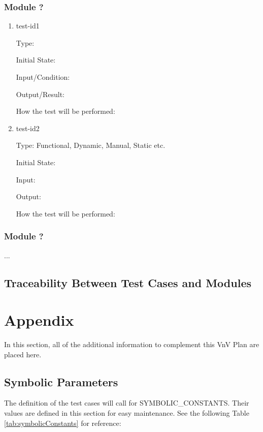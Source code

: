 \documentclass[12pt, titlepage]{article}
\begin{document}
\subsubsection{Module ?}
		
\begin{enumerate}

\item{test-id1\\}

Type: 
					
Initial State: 
					
Input/Condition: 
					
Output/Result: 
					
How the test will be performed: 
					
\item{test-id2\\}

Type: Functional, Dynamic, Manual, Static etc.
					
Initial State: 
					
Input: 
					
Output: 
					
How the test will be performed: 

\end{enumerate}

\subsubsection{Module ?}

...

\subsection{Traceability Between Test Cases and Modules}

				




\newpage

\section{Appendix}
In this section, all of the additional information to complement this VnV Plan are placed here.

\subsection{Symbolic Parameters}
The definition of the test cases will call for SYMBOLIC\_CONSTANTS.
Their values are defined in this section for easy maintenance.
See the following Table \ref{tab:symbolicConstants} for reference:
\end{document}
